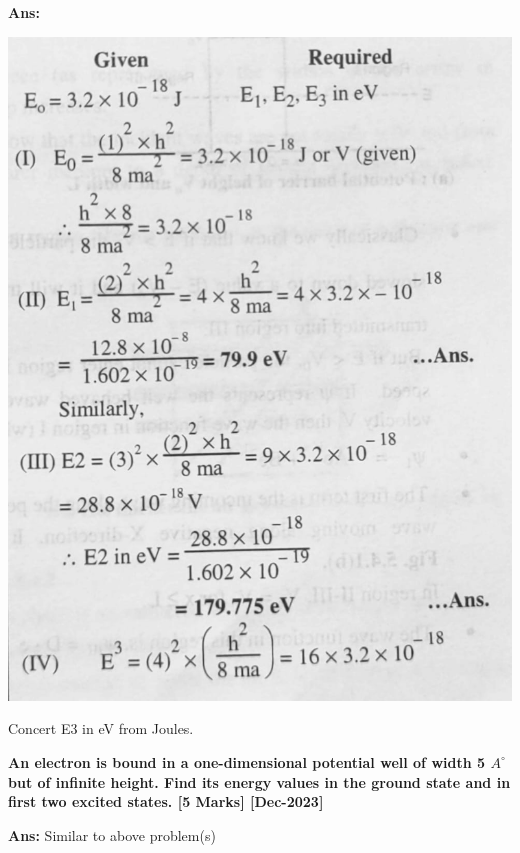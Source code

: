 \documentclass{exam}
\begin{document}
\begin{questions}
\textbf{Ans:} 
\begin{center}
	\includegraphics[scale=0.35]{Q17.jpeg}
\end{center}

Concert E3 in eV from Joules.
 
\question \textbf{An electron is bound in a one-dimensional potential well of width 5 $A^{\circ}$ but of infinite height. Find its energy values in the ground state and in first two excited states.  \hfil[5 Marks] [Dec-2023] }


\textbf{Ans:} Similar to above problem(s)


\end{questions}
	
\end{document}
